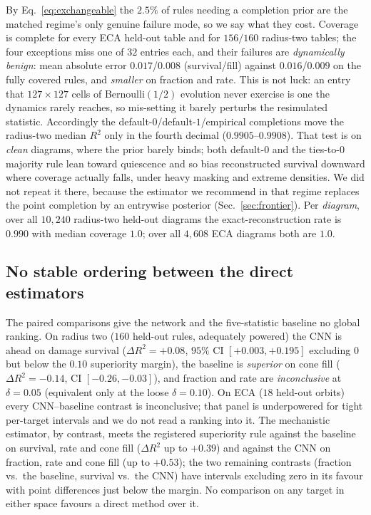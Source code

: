 \documentclass[aip,cha,amsmath,amssymb,reprint,floatfix]{revtex4-2}
\newcommand{\rtwo}{$R^2$}
\begin{document}
By Eq.~\eqref{eq:exchangeable} the $2.5\%$ of rules needing a completion prior
are the matched regime's only genuine failure mode, so we say what they cost.
Coverage is complete for every ECA held-out table and for $156/160$ radius-two
tables; the four exceptions miss one of $32$ entries each, and their failures
are \emph{dynamically benign}: mean absolute error $0.017$/$0.008$
(survival/fill) against $0.016$/$0.009$ on the fully covered rules, and
\emph{smaller} on fraction and rate. This is not luck: an entry that $127\times127$ cells of
Bernoulli$(1/2)$ evolution never exercise is one the dynamics rarely reaches,
so mis-setting it barely perturbs the resimulated statistic. Accordingly the
default-$0$/default-$1$/empirical completions move the radius-two median
\rtwo{} only in the fourth decimal ($0.9905$--$0.9908$). That test is on
\emph{clean} diagrams, where the prior barely binds; both default-$0$ and the
ties-to-$0$ majority rule lean toward quiescence and so bias reconstructed
survival downward where coverage actually falls, under heavy masking and
extreme densities. We did not repeat it there, because the estimator we
recommend in that regime replaces the point completion by an entrywise
posterior (Sec.~\ref{sec:frontier}). Per \emph{diagram}, over all $10{,}240$
radius-two held-out diagrams the exact-reconstruction rate is $0.990$ with
median coverage $1.0$; over all $4{,}608$ ECA diagrams both are $1.0$.

\subsection{No stable ordering between the direct estimators}
\label{sec:paired}

The paired comparisons give the network and the
five-statistic baseline no global ranking. On radius two ($160$ held-out rules,
adequately powered) the CNN is ahead on damage survival ($\Delta R^2=+0.08$,
$95\%$ CI $[+0.003,+0.195]$ excluding $0$ but below the $0.10$ superiority
margin), the baseline is \emph{superior} on cone fill ($\Delta R^2=-0.14$, CI
$[-0.26,-0.03]$), and fraction and rate are \emph{inconclusive} at
$\delta=0.05$ (equivalent only at the loose $\delta=0.10$). On ECA ($18$
held-out orbits) every CNN--baseline contrast is inconclusive; that panel is
underpowered for tight per-target intervals and we do not read a ranking into
it. The mechanistic estimator, by contrast, meets the registered superiority
rule against the baseline on survival, rate and cone fill ($\Delta R^2$ up to
$+0.39$) and against the CNN on fraction, rate and cone fill (up to $+0.53$);
the two remaining contrasts (fraction vs.\ the baseline, survival vs.\ the
CNN) have intervals excluding zero in its favour with point differences just
below the margin. No comparison on any target in either space favours a
direct method over it.
\end{document}
